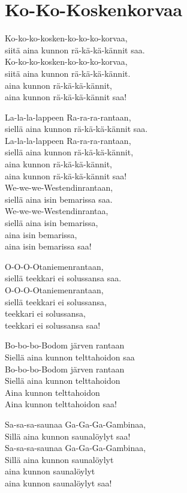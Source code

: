 \section{Ko-Ko-Koskenkorvaa}

Ko-ko-ko-kosken-ko-ko-ko-korvaa,\\
siitä aina kunnon rä-kä-kä-kännit saa.\\
Ko-ko-ko-kosken-ko-ko-ko-korvaa,\\
siitä aina kunnon rä-kä-kä-kännit.\\
aina kunnon rä-kä-kä-kännit,\\
aina kunnon rä-kä-kä-kännit saa!

La-la-la-lappeen Ra-ra-ra-rantaan,\\
siellä aina kunnon rä-kä-kä-kännit saa.\\
La-la-la-lappeen Ra-ra-ra-rantaan,\\
siellä aina kunnon rä-kä-kä-kännit,\\
aina kunnon rä-kä-kä-kännit,\\
aina kunnon rä-kä-kä-kännit saa!\\

We-we-we-Westendinrantaan,\\
siellä aina isin bemarissa saa.\\
We-we-we-Westendinrantaa,\\
siellä aina isin bemarissa,\\
aina isin bemarissa,\\
aina isin bemarissa saa!

O-O-O-Otaniemenrantaan,\\
siellä teekkari ei solussansa saa.\\
O-O-O-Otaniemenrantaan,\\
siellä teekkari ei solussansa,\\
teekkari ei solussansa,\\
teekkari ei solussansa saa!

Bo-bo-bo-Bodom järven rantaan\\
Siellä aina kunnon telttahoidon saa\\
Bo-bo-bo-Bodom järven rantaan\\
Siellä aina kunnon telttahoidon\\
Aina kunnon telttahoidon\\
Aina kunnon telttahoidon saa!

Sa-sa-sa-saunaa Ga-Ga-Ga-Gambinaa,\\
Sillä aina kunnon saunalöylyt saa!\\
Sa-sa-sa-saunaa Ga-Ga-Ga-Gambinaa,\\
Sillä aina kunnon saunalöylyt\\
aina kunnon saunalöylyt\\
aina kunnon saunalöylyt saa!